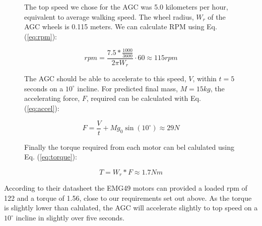 \documentclass[11pt,landscape]{article}
\begin{document}
\begin{multicols}{3}
\begin{figure}[H]
    \begin{mdframed}
        The top speed we chose for the AGC was 5.0 kilometers per hour,
        equivalent to average walking speed. The wheel radius, $W_r$ of the AGC
        wheels is 0.115 meters. We can calculate RPM using Eq. (\ref{eq:rpm}):
        \begin{center}
            \begin{equation}
                rpm = \frac{7.5 * \frac{1000}{3600}}{2\pi W_r} \cdot 60 \approx 115rpm
                \label{eq:rpm}
            \end{equation}
        \end{center}
        The AGC should be able to accelerate to this speed, $V$, within $t=5$
        seconds on a $10^\circ$ incline. For predicted final mass, $M = 15kg$,
        the accelerating force, $F$, required can be calculated with Eq.
        (\ref{eq:accel}):
        \begin{center}
            \begin{equation}
                F = \frac{V}{t} + M g_0 \sin(10^\circ)\approx 29 N
                \label{eq:accel}
            \end{equation}
        \end{center}
        Finally the torque required from each motor can bel calulated using Eq.
        (\ref{eq:torque}):
        \begin{center}
            \begin{equation}
                T = W_r * F \approx 1.7 Nm
                \label{eq:torque} 
            \end{equation}
        \end{center}
    \end{mdframed}
    \label{fig:motor_calcs}
\end{figure}

According to their datasheet the EMG49 motors can provided a loaded rpm of 122
and a torque of 1.56, close to our requirements set out above. As the torque is
slightly lower than calulated, the AGC will accelerate slightly to top speed on
a $10^\circ$ incline in slightly over five seconds.


\end{multicols}
\end{document}
